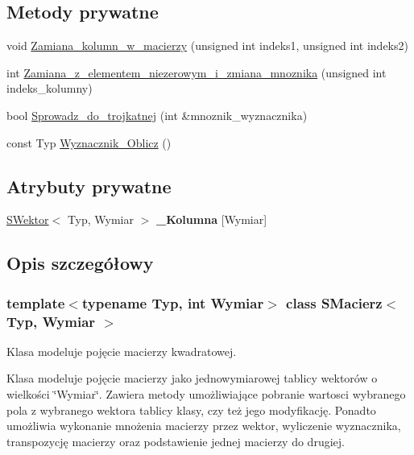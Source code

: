 \subsection*{Metody prywatne}
\begin{DoxyCompactItemize}
\item 
void \hyperlink{classSMacierz_afee8329b07e345879eead08f3a316f62}{Zamiana\+\_\+kolumn\+\_\+w\+\_\+macierzy} (unsigned int indeks1, unsigned int indeks2)
\item 
int \hyperlink{classSMacierz_aceb9638a718d4e5e0a03a020b041aa0d}{Zamiana\+\_\+z\+\_\+elementem\+\_\+niezerowym\+\_\+i\+\_\+zmiana\+\_\+mnoznika} (unsigned int indeks\+\_\+kolumny)
\item 
bool \hyperlink{classSMacierz_aca41f9c5eaf53fdb6ddb5f065f816fcd}{Sprowadz\+\_\+do\+\_\+trojkatnej} (int \&mnoznik\+\_\+wyznacznika)
\item 
const Typ \hyperlink{classSMacierz_a89430b42ebd5e4b6a5bd65b91d2124ca}{Wyznacznik\+\_\+\+Oblicz} ()
\end{DoxyCompactItemize}
\subsection*{Atrybuty prywatne}
\begin{DoxyCompactItemize}
\item 
\mbox{\label{classSMacierz_aba0891504ff93e4d1678867e2d787b1c}} 
\hyperlink{classSWektor}{S\+Wektor}$<$ Typ, Wymiar $>$ {\bfseries \+\_\+\+Kolumna} \mbox{[}Wymiar\mbox{]}
\end{DoxyCompactItemize}


\subsection{Opis szczegółowy}
\subsubsection*{template$<$typename Typ, int Wymiar$>$\newline
class S\+Macierz$<$ Typ, Wymiar $>$}

Klasa modeluje pojęcie macierzy kwadratowej. 

Klasa modeluje pojęcie macierzy jako jednowymiarowej tablicy wektorów o wielkości \char`\"{}\+Wymiar\char`\"{}. Zawiera metody umożliwiające pobranie wartosci wybranego pola z wybranego wektora tablicy klasy, czy też jego modyfikację. Ponadto umożliwia wykonanie mnożenia macierzy przez wektor, wyliczenie wyznacznika, transpozycję macierzy oraz podstawienie jednej macierzy do drugiej. 

